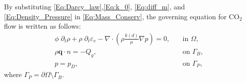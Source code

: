 

By substituting  \eqref{Eq:Darcy_law},\eqref{Eq:k_0}, \eqref{Eq:diff_m}, and \eqref{Eq:Density_Pressure} in \eqref{Eq:Mass_Conserv}, the governing equation for CO$_2$ flow is written as follows: 
\begin{equation}\label{Eq:General_pressure}
\begin{aligned}
\phi \; \partial_t \rho+\rho \; \partial_t \varepsilon_v -\nabla \cdot \left( \rho \frac{ k(d)}{\mu} \nabla p \right) =0,  \quad  &\text{in~} \Omega,\\
    \rho\bm{q} \cdot n =-Q_g,  \quad  &\text{on~} \Gamma_B,\\
    p = p_D, \quad &\text{on~}\Gamma_P,
\end{aligned}
\end{equation}
where $\Gamma_P=\partial\Omega\setminus\Gamma_B$. 

